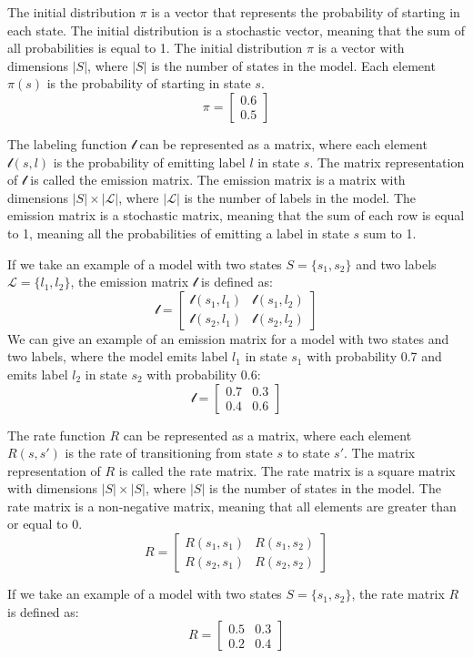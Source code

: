 The initial distribution $\pi$ is a vector that represents the probability of starting in each state. 
The initial distribution is a stochastic vector, meaning that the sum of all probabilities is equal to 1. 
The initial distribution $\pi$ is a vector with dimensions $|S|$, where $|S|$ is the number of states in the model. 
Each element $\pi(s)$ is the probability of starting in state $s$.
\begin{equation}
    \pi = \begin{bmatrix}
        0.6 \\
        0.5
    \end{bmatrix}
\end{equation}

The labeling function $\mathscr{l}$ can be represented as a matrix, where each element $\mathscr{l}(s, l)$ is the probability of emitting label $l$ in state $s$.
The matrix representation of $\mathscr{l}$ is called the emission matrix.
The emission matrix is a matrix with dimensions $|S| \times |\mathcal{L}|$, where $|\mathcal{L}|$ is the number of labels in the model.
The emission matrix is a stochastic matrix, meaning that the sum of each row is equal to 1, meaning all the probabilities of emitting a label in state $s$ sum to 1. 

If we take an example of a model with two states $S = \{s_1, s_2\}$ and two labels $\mathcal{L} = \{l_1, l_2\}$, the emission matrix $\mathscr{l}$ is defined as:
\begin{equation}
    \mathscr{l} = \begin{bmatrix}
        \mathscr{l}(s_1, l_1) & \mathscr{l}(s_1, l_2) \\
        \mathscr{l}(s_2, l_1) & \mathscr{l}(s_2, l_2)
    \end{bmatrix}
\end{equation}
We can give an example of an emission matrix for a model with two states and two labels, where the model emits label $l_1$ in state $s_1$ with probability 0.7 and emits label $l_2$ in state $s_2$ with probability 0.6:
\begin{equation}
    \mathscr{l} = \begin{bmatrix}
        0.7 & 0.3 \\
        0.4 & 0.6
    \end{bmatrix}
\end{equation}

The rate function $R$ can be represented as a matrix, where each element $R(s, s')$ is the rate of transitioning from state $s$ to state $s'$. 
The matrix representation of $R$ is called the rate matrix. 
The rate matrix is a square matrix with dimensions $|S| \times |S|$, where $|S|$ is the number of states in the model. 
The rate matrix is a non-negative matrix, meaning that all elements are greater than or equal to 0.
\begin{equation}
    R = \begin{bmatrix}
        R(s_1, s_1) & R(s_1, s_2) \\
        R(s_2, s_1) & R(s_2, s_2)
    \end{bmatrix}
\end{equation}

If we take an example of a model with two states $S = \{s_1, s_2\}$, the rate matrix $R$ is defined as:
\begin{equation}
    R = \begin{bmatrix}
        0.5 & 0.3 \\
        0.2 & 0.4
    \end{bmatrix}   
\end{equation}